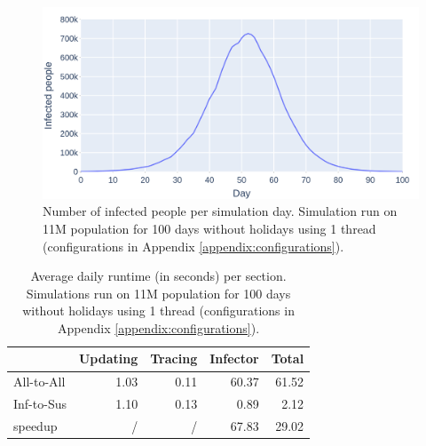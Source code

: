 \begin{figure}
    \centering
    \includegraphics[width=.8\linewidth]{3 - Stride/fig/basis_infected.png}
    \caption{Number of infected people per simulation day. Simulation run on 11M population for 100 days without holidays using 1 thread (configurations in Appendix \ref{appendix:configurations}).}
    \label{fig:basis_infected}
\end{figure}

\begin{table}
\centering
\begin{tabular}{@{}lrrrr@{}}
\toprule
           & Updating & Tracing & Infector & Total \\ \midrule
All-to-All & 1.03     & 0.11    & 60.37    & 61.52 \\
Inf-to-Sus & 1.10     & 0.13    & 0.89     & 2.12  \\ \midrule
speedup    & /        & /       & 67.83    & 29.02 \\ \bottomrule
\end{tabular}
\caption{Average daily runtime (in seconds) per section. Simulations run on 11M population for 100 days without holidays using 1 thread (configurations in Appendix \ref{appendix:configurations}).}
\label{tab:basis_runtime_stats}
\end{table}

